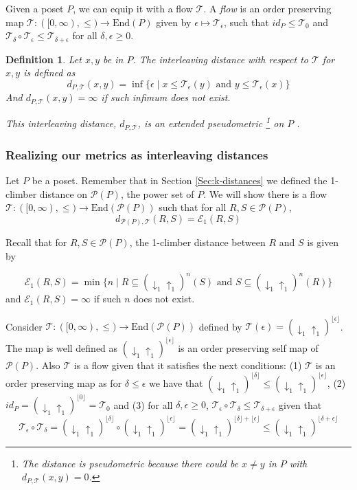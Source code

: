 \documentclass{article}[12pt]
\theoremstyle{exampstyle}
\newtheorem{definition}[theorem]{Definition}
\theoremstyle{remark}
\newcommand{\E}{\mathcal{E}}
\renewcommand{\P}{\mathcal{P}}
\newcommand{\T}{\mathcal{T}}
\newcommand{\updown}[1][]{\downarrow_{#1} \uparrow_{#1}}
\newcommand{\End}{\text{End}}
\begin{document}
Given a poset $P$, we can equip it with a flow $\T$. A \textit{flow} is an order preserving map $\T : ([0,\infty), \leq ) \to \End(P)$ given by $\epsilon \mapsto \T_{\epsilon}$, such that $id_P \leq \T_0$ and  $\T_{\delta} \circ \T_{\epsilon} \leq \T_{\delta + \epsilon}$ for all $\delta, \epsilon \geq 0$. 

\begin{definition}
 Let $x,y$ be in $P$. The interleaving distance with respect to $\T$ for $x,y$ is defined as 
 \begin{equation*}
     d_{P,\T}(x,y) = \inf \{ \epsilon  \mid x \leq \T_\epsilon (y) \text{ and } y \leq \T_\epsilon(x) \}
 \end{equation*}
 And $ d_{P,\T}(x,y) = \infty$ if such infimum does not exist.

This interleaving distance, $d_{P,\T}$, is an extended pseudometric \footnote{The distance is pseudometric because there could be $x \neq y$ in $P$ with $d_{P,\T}(x,y) = 0$.} on $P$ \cite{Flow}.
\end{definition}

\subsubsection*{Realizing our metrics as interleaving distances}

Let $P$ be a poset. Remember that in Section \ref{Sec:k-distances} we defined the 1-climber distance on $\P(P)$, the power set of $P$. We will show there is a flow $\T: ([0,\infty), \leq ) \to \End(\P(P))$ such that for all $R,S \in \P(P)$, 
\begin{equation*}
    d_{\P(P),\T}(R,S) = \E_1(R,S)
\end{equation*}

Recall that for $R,S \in \P(P)$, the 1-climber distance between $R$ and $S$ is given by

 \begin{equation*}
    \E_1(R,S) = \min \{ n \mid R \subseteq (\updown[1])^{n} (S) \text{ and } S \subseteq (\updown[1])^{n} (R) \}
\end{equation*}
and $\E_1(R,S)= \infty $ if such $n$ does not exist.

Consider $\T: ([0,\infty), \leq ) \to \End(\P(P))$ defined by $\T(\epsilon) = (\updown[1])^{\lfloor \epsilon \rfloor}$. The map is well defined as $(\updown[1])^{\lfloor \epsilon \rfloor}$ is an order preserving self map of $\P(P)$. Also $\T$ is a flow given that it satisfies the next conditions: (1) $\T$ is an order preserving map as for $\delta \leq \epsilon$ we have that $(\updown[1])^{\lfloor \delta \rfloor} \leq (\updown[1])^{\lfloor \epsilon \rfloor} $, (2) $id_P  =   (\updown[1])^{\lfloor 0 \rfloor} = \T_0$ and (3) for all $ \delta, \epsilon \geq 0$, $\T_{\epsilon} \circ \T_{\delta} \leq \T_{\delta + \epsilon}$  given that 
\begin{equation*}
    \T_{\epsilon} \circ \T_{\delta} = (\updown[1])^{\lfloor \delta \rfloor} \circ (\updown[1])^{\lfloor \epsilon \rfloor}  = (\updown[1])^{\lfloor \delta \rfloor + \lfloor \epsilon \rfloor} \leq (\updown[1])^{\lfloor \delta + \epsilon \rfloor} 
\end{equation*}
\end{document}
